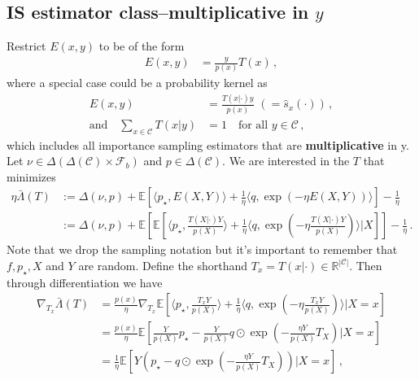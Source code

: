\documentclass{article}
\theoremstyle{plain}
\theoremstyle{definition}
\theoremstyle{remark}
\newcommand{\R}{\mathbb R}
\newcommand{\E}{\mathbb E}
\newcommand{\cF}{\mathcal F}
\newcommand{\cC}{\mathcal C}
\theoremstyle{definition}
\begin{document}
\subsection{IS estimator class--multiplicative in $y$}
Restrict $E(x,y)$ to be of the form
\begin{align*}
    E(x,y) & = \frac{y}{p(x)} T(x)\,,
\end{align*}
where a special case could be a probability kernel as
\begin{align*}
    E(x,y)                  & = \frac{T(x|\cdot) y}{p(x)} \,\,(= \hat{s}_x(\cdot))\,, \\
    \text{and} \quad
    \sum_{x \in \cC} T(x|y) & = 1\quad \text{for all } y \in \cC\,,
\end{align*}
which includes all importance sampling estimators that are \textbf{multiplicative} in y.
Let $\nu \in \Delta(\Delta(\cC) \times \cF_b)$ and $p \in \Delta(\cC)$.
We are interested in the $T$ that minimizes
\begin{align*}
    \eta \bar \Lambda(T)
     & :=
    \Delta(\nu, p) +
    \E\!\left[
        \langle p_\star, E(X, Y) \rangle
        + \frac{1}{\eta}
        \langle q, \exp(- \eta E(X, Y))\rangle
        \right]
    - \frac{1}{\eta}
    \\
     & :=
    \Delta(\nu, p) +
    \E\!\left[
        \E\left[
            \langle p_\star, \tfrac{T(X|\cdot) Y}{p(X)} \rangle
            + \frac{1}{\eta}
            \langle q, \exp(- \eta \tfrac{T(X|\cdot) Y}{p(X)})\rangle
            \bigg| X
            \right]
        \right]
    - \frac{1}{\eta}\,.
\end{align*}
Note that we drop the sampling notation but it's important to remember that $f, p_\star, X$ and $Y$ are random.
Define the shorthand $T_x = T(x| \cdot) \in \R^{|\cC|}$.
Then through differentiation we have
\begin{align*}
    \nabla_{T_x} \bar{\Lambda}(T)
     & = \tfrac{p(x)}{\eta}\nabla_{T_x} \E\!\left[
        \langle p_\star, \tfrac{T_x Y}{p(X)} \rangle
        + \frac{1}{\eta}
        \langle q, \exp(- \eta \tfrac{T_x Y}{p(X)})\rangle
        | X = x
        \right]
    \\
     & = \tfrac{p(x)}{\eta} \E\!\left[
        \tfrac{Y}{p(X)} p_\star
        - \tfrac{Y}{p(X)} q \odot \exp(- \tfrac{\eta Y}{p(X)} T_X)
        | X = x
        \right]
    \\
     & = \tfrac{1}{\eta} \E\!\left[
        Y \left(
        p_\star
        - q \odot \exp(- \tfrac{\eta Y}{p(X)} T_X)
        \right)
        | X = x
        \right]\,,
\end{align*}
\end{document}

